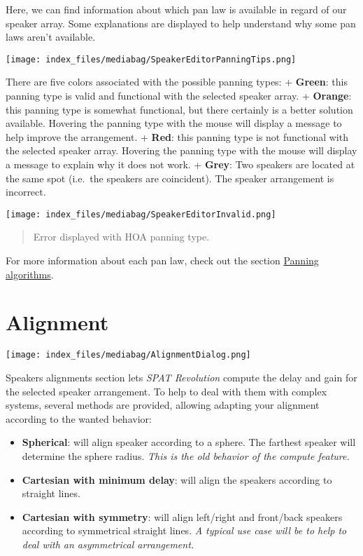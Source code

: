 \documentclass[
  letterpaper,
  DIV=11,
  numbers=noendperiod]{scrreport}
\providecommand{\tightlist}{%
  \setlength{\itemsep}{0pt}\setlength{\parskip}{0pt}}\usepackage{longtable,booktabs,array}
\begin{document}
Here, we can find information about which pan law is available in regard
of our speaker array. Some explanations are displayed to help understand
why some pan laws aren't available.

\texttt{[image: index\_files/mediabag/SpeakerEditorPanningTips.png]}

There are five colors associated with the possible panning types: +
\textbf{Green}: this panning type is valid and functional with the
selected speaker array. + \textbf{Orange}: this panning type is somewhat
functional, but there certainly is a better solution available. Hovering
the panning type with the mouse will display a message to help improve
the arrangement. + \textbf{Red}: this panning type is not functional
with the selected speaker array. Hovering the panning type with the
mouse will display a message to explain why it does not work. +
\textbf{Grey}: Two speakers are located at the same spot (i.e.~the
speakers are coincident). The speaker arrangement is incorrect.

\texttt{[image: index\_files/mediabag/SpeakerEditorInvalid.png]}

\begin{quote}
Error displayed with HOA panning type.
\end{quote}

For more information about each pan law, check out the section
\href{Spatialisation_Technology_Panning_Algorithms.md}{Panning
algorithms}.

\hypertarget{alignment}{%
\section{Alignment}\label{alignment}}

\texttt{[image: index\_files/mediabag/AlignmentDialog.png]}

Speakers alignments section lets \emph{SPAT Revolution} compute the
delay and gain for the selected speaker arrangement. To help to deal
with them with complex systems, several methods are provided, allowing
adapting your alignment according to the wanted behavior:

\begin{itemize}
\tightlist
\item
  \textbf{Spherical}: will align speaker according to a sphere. The
  farthest speaker will determine the sphere radius. \emph{This is the
  old behavior of the compute feature.}
\item
  \textbf{Cartesian with minimum delay}: will align the speakers
  according to straight lines.
\item
  \textbf{Cartesian with symmetry}: will align left/right and front/back
  speakers according to symmetrical straight lines. \emph{A typical use
  case will be to help to deal with an asymmetrical arrangement.}
\end{itemize}
\end{document}
